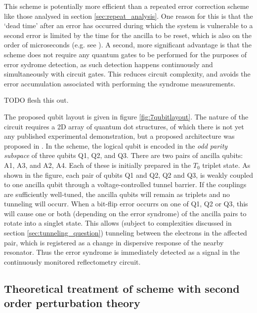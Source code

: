 \documentclass{report}
\begin{document}
This scheme is potentially more efficient than a repeated error correction scheme like those analysed in section \ref{sec:repeat_analysis}. One reason for this is that the `dead time' after an error has occurred during which the system is vulnerable to a second error is limited by the time for the ancilla to be reset, which is also on the order of microseconds (e.g. see \cite{Nakajima2019}). A second, more significant advantage is that the scheme does not require any quantum gates to be performed for the purposes of error sydrome detection, as such detection happens continuously and simultaneously with circuit gates. This reduces circuit complexity, and avoids the error accumulation associated with performing the syndrome measurements. 

TODO flesh this out.



The proposed qubit layout is given in figure \ref{fig:7qubitlayout}. The nature of the circuit requires a 2D array of quantum dot structures, of which there is not yet any published experimental demonstration, but a proposed architecture was proposed in \cite{Tadokoro2021_2}. In the scheme, the logical qubit is encoded in the \textit{odd parity subspace} of three qubits Q1, Q2, and Q3. There are two pairs of ancilla qubits: A1, A3, and A2, A4. Each of these is initially prepared in the $T_0$ triplet state. As shown in the figure, each pair of qubits Q1 and Q2, Q2 and Q3, is weakly coupled to one ancilla qubit through a voltage-controlled tunnel barrier. If the couplings are sufficiently well-tuned, the ancilla qubits will remain as triplets and no tunneling will occurr. When a bit-flip error occurrs on one of Q1, Q2 or Q3, this will cause one or both (depending on the error syndrome) of the ancilla pairs to rotate into a singlet state. This allows (subject to complexities discussed in section \ref{sec:tunneling_question}) tunneling between the electrons in the affected pair, which is registered as a change in dispersive response of the nearby resonator. Thus the error syndrome is immediately detected as a signal in the continuously monitored reflectometry circuit.

\subsection{Theoretical treatment of scheme with second order perturbation theory}
\end{document}
